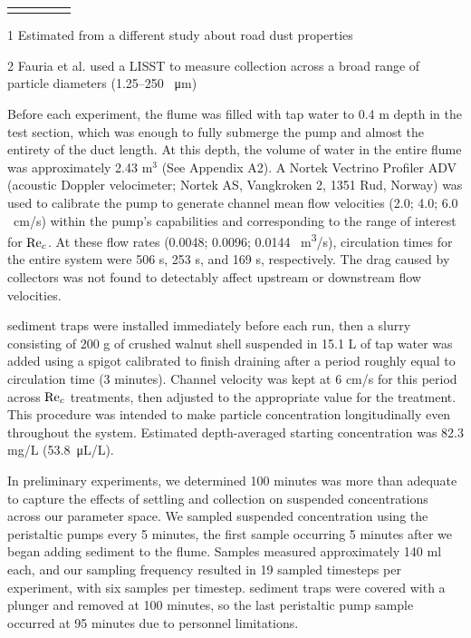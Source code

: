 \documentclass[geosciences,article,submit,moreauthors,pdftex]{Definitions/mdpi}
\begin{document}
\begin{table}[h]
\begin{threeparttable}
\begin{tabular}{lcccc}
\bottomrule
\vspace{-4mm}
\end{tabular}
\begin{tablenotes}
\footnotesize \item[1] Estimated from a different study about road dust properties \cite{mckenzie2008size} 
\vspace{2mm}
\footnotesize \item[2] Fauria et al. \cite{Fauria_2015} used a LISST to measure collection across a broad range of particle diameters (1.25--250 \SI{}{\micro\metre})
\end{tablenotes}
\end{threeparttable}
\label{tbl:parameters}
\end{table}

Before each experiment, the flume was filled with tap water to 0.4 m depth in the test section, which was enough to fully submerge the pump and almost the entirety of the duct length. At this depth, the volume of water in the entire flume was approximately 2.43 m$^3$ (See Appendix A2).  A Nortek Vectrino Profiler ADV (acoustic Doppler velocimeter; Nortek AS, Vangkroken 2, 1351 Rud, Norway) was used to calibrate the pump to generate channel mean flow velocities (2.0; 4.0; 6.0 \SI{}{\centi\metre/\second}) within the pump's capabilities and corresponding to the range of interest for $\mathrm{Re}_c$. At these flow rates (0.0048; 0.0096; 0.0144 \SI{}{\metre\cubed/\second}), circulation times for the entire system were 506 s, 253 s, and 169 s, respectively. The drag caused by collectors was not found to detectably affect upstream or downstream flow velocities.

sediment traps were installed immediately before each run, then a slurry consisting of 200 g of crushed walnut shell suspended in 15.1 L of tap water was added using a spigot calibrated to finish draining after a period roughly equal to circulation time (3 minutes). Channel velocity was kept at 6 cm/s for this period across $\mathrm{Re}_c$ treatments, then adjusted to the appropriate value for the treatment. This procedure was intended to make particle concentration longitudinally even throughout the system. Estimated depth-averaged starting concentration was 82.3 mg/L (\SI{53.8}{\micro\liter/\liter}).

In preliminary experiments, we determined 100 minutes was more than adequate to capture the effects of settling and collection on suspended concentrations across our parameter space. We sampled suspended concentration using the peristaltic pumps every 5 minutes, the first sample occurring 5 minutes after we began adding sediment to the flume. Samples measured approximately 140 ml each, and our sampling frequency resulted in 19 sampled timesteps per experiment, with six samples per timestep. sediment traps were covered with a plunger and removed at 100 minutes, so the last peristaltic pump sample occurred at 95 minutes due to personnel limitations.
\end{document}
